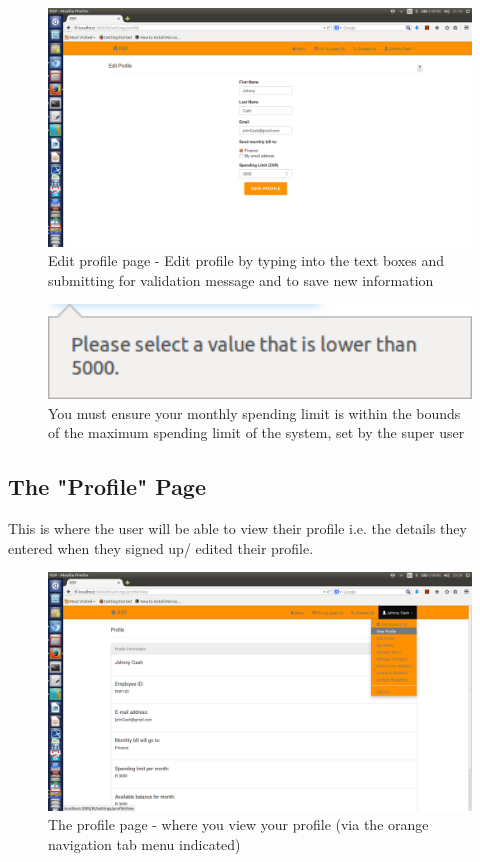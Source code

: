 \documentclass[a4paper,12pt]{report}
\begin{document}
\begin{figure}[H]
  \centering
    \includegraphics[width=1.0\textwidth]{screenshots/editProfile.png}
    \caption{Edit profile page - Edit profile by typing into the text boxes and submitting for validation message and to save new information } 
\end{figure}

\begin{figure}[H]
  \centering
    \includegraphics[width=1.0\textwidth]{screenshots/limitExeeds.png}
    \caption{You must ensure your monthly spending limit is within the bounds of the maximum spending limit of the system, set by the super user} 
\end{figure}

\subsection{The "Profile" Page} 
This is where the user will be able to view their profile i.e. the details they entered when they signed up/ edited their profile. 

\begin{figure}[H]
  \centering
    \includegraphics[width=1.0\textwidth]{screenshots/viewProfile.png}
    \caption{The profile page - where you view your profile (via the orange navigation tab menu indicated)} 
\end{figure}
\end{document}
